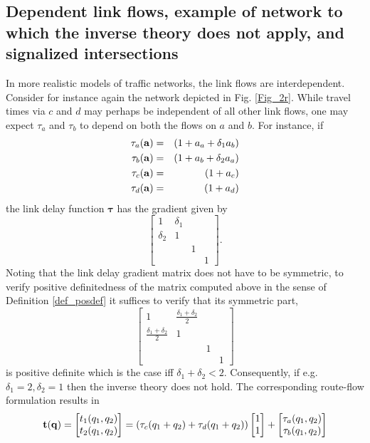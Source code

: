\documentclass[a4paper,11pt]{article}
\begin{document}
\subsection{Dependent link flows, example of network to which the inverse theory does not apply, and signalized intersections}
In more realistic models of traffic networks, the link flows are interdependent. Consider for instance again the network depicted in Fig. \ref{Fig_2r}. While travel times via $c$ and $d$ may perhaps be independent of all other link flows, one may expect $\tau_a$ and $\tau_b$ to depend on both the flows on $a$ and $b$.  For instance, if
\begin{eqnarray*}
\tau_a(\bold{a}) &=& (1 + a_a + \delta_1 a_b)\\
\tau_b(\bold{a}) &=& (1 + a_b + \delta_2 a_a)\\
\tau_c(\bold{a}) &=& (1 + a_c)\\
\tau_d(\bold{a}) &=& (1 + a_d)
\end{eqnarray*}
the link delay function $\boldsymbol{\tau}$ has the gradient given by 
\begin{equation*}
\begin{bmatrix}
1 & \delta_1 && \\
\delta_2 & 1 &&\\
&&1&\\
&&&1
\end{bmatrix}.
\end{equation*}
Noting that the link delay gradient matrix does not have to be symmetric, to verify positive definitedness of the matrix computed above in the sense of Definition \ref{def_posdef} it suffices to verify that its symmetric part, 
\begin{equation*}
\begin{bmatrix}
1 & \frac{\delta_1+\delta_2}{2} && \\
\frac {\delta_1+\delta_2}{2} & 1 &&\\
&&1&\\
&&&1
\end{bmatrix}
\end{equation*}
is positive definite which is the case iff $\delta_1 + \delta_2 <2$. Consequently, if e.g. $\delta_1 = 2, \delta_2 = 1$ then the inverse theory does not hold. The corresponding route-flow formulation results in
$$\bold{t}(\bold{q}) = \begin{bmatrix} t_1(q_1,q_2) \\ t_2(q_1,q_2)\end{bmatrix} =  (\tau_c(q_1 + q_2) + \tau_d(q_1 + q_2))\begin{bmatrix} 1 \\ 1\end{bmatrix} + \begin{bmatrix} \tau_a(q_1,q_2) \\ \tau_b(q_1,q_2) \end{bmatrix}$$ 
\end{document}
